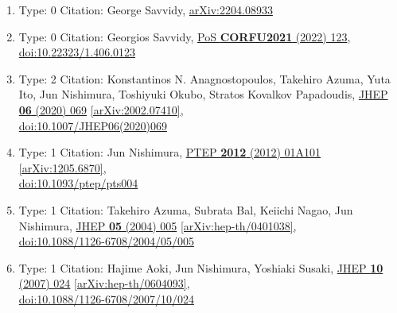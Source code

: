 \documentclass[a4paper,10pt]{article}
\begin{document}
\begin{enumerate}
\begin{enumerate}
  \item Type: 0 Citation: George Savvidy, \href{https://arxiv.org/abs/2204.08933}{arXiv:2204.08933}
  \item Type: 0 Citation: Georgios Savvidy, \href{https://www.doi.org/10.22323/1.406.0123}{PoS {\bf CORFU2021} (2022) 123},\\\href{https://www.doi.org/10.22323/1.406.0123}{doi:10.22323/1.406.0123}
  \item Type: 2 Citation: Konstantinos N. Anagnostopoulos, Takehiro Azuma, Yuta Ito, Jun Nishimura, Toshiyuki Okubo, Stratos Kovalkov Papadoudis, \href{https://www.doi.org/10.1007/JHEP06(2020)069}{JHEP {\bf 06} (2020) 069}  \href{https://arxiv.org/abs/2002.07410}{[arXiv:2002.07410]},\\\href{https://www.doi.org/10.1007/JHEP06(2020)069}{doi:10.1007/JHEP06(2020)069}
  \item Type: 1 Citation: Jun Nishimura, \href{https://www.doi.org/10.1093/ptep/pts004}{PTEP {\bf 2012} (2012) 01A101}  \href{https://arxiv.org/abs/1205.6870}{[arXiv:1205.6870]},\\\href{https://www.doi.org/10.1093/ptep/pts004}{doi:10.1093/ptep/pts004}
  \item Type: 1 Citation: Takehiro Azuma, Subrata Bal, Keiichi Nagao, Jun Nishimura, \href{https://www.doi.org/10.1088/1126-6708/2004/05/005}{JHEP {\bf 05} (2004) 005}  \href{https://arxiv.org/abs/hep-th/0401038}{[arXiv:hep-th/0401038]},\\\href{https://www.doi.org/10.1088/1126-6708/2004/05/005}{doi:10.1088/1126-6708/2004/05/005}
  \item Type: 1 Citation: Hajime Aoki, Jun Nishimura, Yoshiaki Susaki, \href{https://www.doi.org/10.1088/1126-6708/2007/10/024}{JHEP {\bf 10} (2007) 024}  \href{https://arxiv.org/abs/hep-th/0604093}{[arXiv:hep-th/0604093]},\\\href{https://www.doi.org/10.1088/1126-6708/2007/10/024}{doi:10.1088/1126-6708/2007/10/024}

\end{enumerate}
\end{enumerate}
\end{document}
